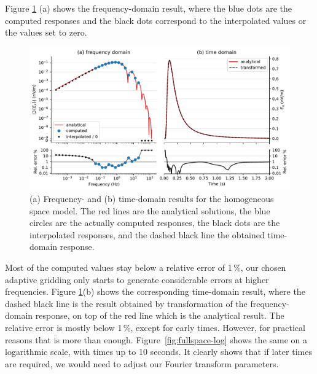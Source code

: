 \documentclass[extra, camera,%
    onecolumn,   %
    referee,     %
]{gji}
\newlength{\fwidth}
\begin{document}
Figure \ref{fig:fullspace} (a) shows the frequency-domain result, where the
blue dots are the computed responses and the black dots correspond to the
interpolated values or the values set to zero.
%
\begin{figure}
  \centering
  \includegraphics[width=\fwidth]{04-fullspace}
  \caption{(a) Frequency- and (b) time-domain results for the homogeneous space
    model. The red lines are the analytical solutions, the blue circles are the
    actually computed responses, the black dots are the interpolated responses,
    and the dashed black line the obtained time-domain response. }
  \label{fig:fullspace}
\end{figure}
%
Most of the computed values stay below a relative error of 1\,\%, our chosen
adaptive gridding only starts to generate considerable errors at higher
frequencies. Figure \ref{fig:fullspace}(b) shows the corresponding time-domain
result, where the dashed black line is the result obtained by transformation of
the frequency-domain response, on top of the red line which is the analytical
result. The relative error is mostly below 1\,\%, except for early times.
However, for practical reasons that is more than enough.
Figure~\ref{fig:fullspace-log} shows the same on a logarithmic scale, with
times up to 10 seconds. It clearly shows that if later times are required, we
would need to adjust our Fourier transform parameters.
%
\end{document}
